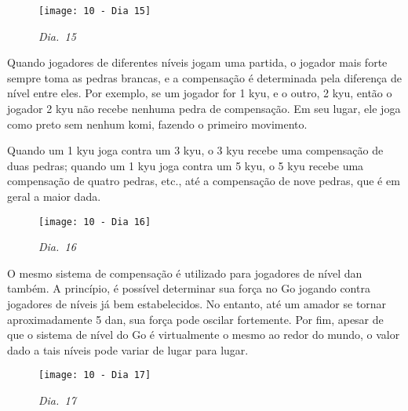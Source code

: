 \begin{wrapfigure}{r}{60mm}
    \vspace{-30pt}
    \begin{center}
        \texttt{[image: 10 - Dia 15]}
        \captionsetup{justification=centering}
        \caption*{\emph{Dia.\@~15}}
    \end{center}
    \vspace{-25pt}
\end{wrapfigure}

Quando jogadores de diferentes níveis jogam uma partida, o jogador mais forte sempre toma as pedras brancas, e a compensação é determinada pela diferença de nível entre eles. Por exemplo, se um jogador for 1 kyu, e o outro, 2 kyu, então o jogador 2 kyu não recebe nenhuma pedra de compensação. Em seu lugar, ele joga como preto sem nenhum komi, fazendo o primeiro movimento.

Quando um 1 kyu joga contra um 3 kyu, o 3 kyu recebe uma compensação de duas pedras; quando um 1 kyu joga contra um 5 kyu, o 5 kyu recebe uma compensação de quatro pedras, etc., até a compensação de nove pedras, que é em geral a maior dada.

\begin{wrapfigure}{l}{60mm}
    \vspace{-25pt}
    \begin{center}
        \texttt{[image: 10 - Dia 16]}
        \captionsetup{justification=centering}
        \caption*{\emph{Dia.\@~16}}
    \end{center}
    \vspace{-30pt}
\end{wrapfigure}

O mesmo sistema de compensação é utilizado para jogadores de nível dan também. A princípio, é possível determinar sua força no Go jogando contra jogadores de níveis já bem estabelecidos. No entanto, até um amador se tornar aproximadamente 5 dan, sua força pode oscilar fortemente. Por fim, apesar de que o sistema de nível do Go é virtualmente o mesmo ao redor do mundo, o valor dado a tais níveis pode variar de lugar para lugar.

\pagebreak

\begin{wrapfigure}{r}{60mm}
    \vspace{-20pt}
    \begin{center}
        \texttt{[image: 10 - Dia 17]}
        \captionsetup{justification=centering}
        \caption*{\emph{Dia.\@~17}}
    \end{center}
    \vspace{-35pt}
\end{wrapfigure}

